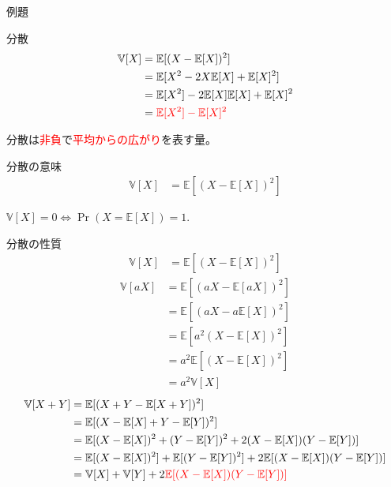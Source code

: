 \documentclass[lualatex,handout]{beamer}
\newcommand{\emm}[1]{\textcolor{red}{#1}}
\newcommand{\expt}[1]{\mathbb{E}[#1]}
\newcommand{\var}[1]{\mathbb{V}[#1]}
\theoremstyle{definition}
\begin{document}
\begin{frame}{例題}
\end{frame}

\begin{frame}{分散}
\begin{align*}
\var{X} &= \expt{(X-\expt{X})^2}\\
&=\expt{X^2-2X\expt{X}+\expt{X}^2}\\
&=\expt{X^2}-2\expt{X}\expt{X}+\expt{X}^2\\
&=\emm{\expt{X^2}-\expt{X}^2}\\
\end{align*}
\begin{center}
分散は\emm{非負}で\emm{平均からの広がり}を表す量。
\end{center}
\end{frame}

\begin{frame}{分散の意味}
\begin{align*}
\var{X} &= \expt{(X-\expt{X})^2}
\end{align*}

$\var{X} = 0 \iff \Pr(X = \expt{X})=1$.
\end{frame}

\begin{frame}{分散の性質}
\begin{align*}
\var{X} &= \expt{(X-\expt{X})^2}
\end{align*}
\begin{align*}
\var{aX} &= \expt{(aX-\expt{aX})^2}\\
&= \expt{(aX-a\expt{X})^2}\\
&= \expt{a^2(X-\expt{X})^2}\\
&= a^2\expt{(X-\expt{X})^2}\\
&= a^2\var{X}
\end{align*}
%
\begin{align*}
\var{X+Y} &= \expt{(X+Y-\expt{X+Y})^2}\\
 &= \expt{(X-\expt{X}+Y-\expt{Y})^2}\\
 &= \expt{(X-\expt{X})^2+(Y-\expt{Y})^2 + 2(X-\expt{X})(Y-\expt{Y})}\\
 &= \expt{(X-\expt{X})^2}+\expt{(Y-\expt{Y})^2} + 2\expt{(X-\expt{X})(Y-\expt{Y})}\\
 &= \var{X}+\var{Y}+ 2\emm{\expt{(X-\expt{X})(Y-\expt{Y})}}\\
\end{align*}
\end{frame}
\end{document}
